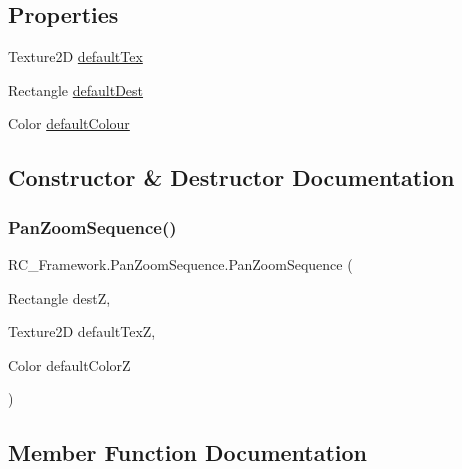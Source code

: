 \subsection*{Properties}
\begin{DoxyCompactItemize}
\item 
Texture2D \mbox{\hyperlink{class_r_c___framework_1_1_pan_zoom_sequence_a39a1630167632f8cfd7004083f9f8099}{default\+Tex}}
\item 
Rectangle \mbox{\hyperlink{class_r_c___framework_1_1_pan_zoom_sequence_ab3b02fbe31f614dc4e7fdc5d3ff076d0}{default\+Dest}}
\item 
Color \mbox{\hyperlink{class_r_c___framework_1_1_pan_zoom_sequence_a252b67cb0eb86c4dd81ce80230421ca5}{default\+Colour}}
\end{DoxyCompactItemize}


\subsection{Constructor \& Destructor Documentation}
\mbox{\label{class_r_c___framework_1_1_pan_zoom_sequence_acf6051001df62fee79c67a3e53012341}} 
\subsubsection{\texorpdfstring{Pan\+Zoom\+Sequence()}{PanZoomSequence()}}
{\footnotesize\ttfamily R\+C\+\_\+\+Framework.\+Pan\+Zoom\+Sequence.\+Pan\+Zoom\+Sequence (\begin{DoxyParamCaption}\item[{Rectangle}]{destZ,  }\item[{Texture2D}]{default\+TexZ,  }\item[{Color}]{default\+ColorZ }\end{DoxyParamCaption})}



\subsection{Member Function Documentation}
\mbox{\label{class_r_c___framework_1_1_pan_zoom_sequence_a6e2a1cbdd12386dd59daab6ab1bb94fc}} 
